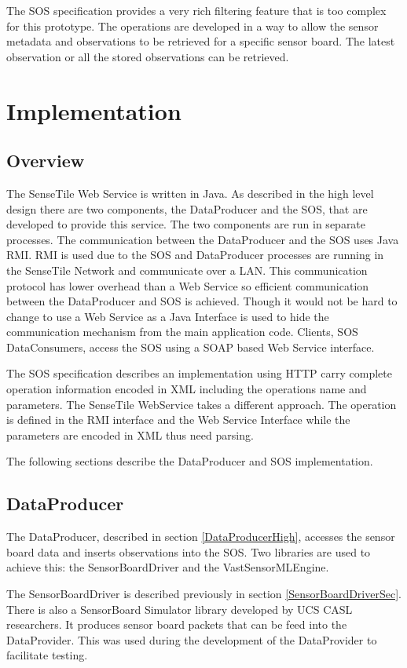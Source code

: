 \documentclass[]{final_report}
\begin{document}
The SOS specification provides a very rich filtering feature that is too complex for this prototype. The operations are developed in a way to allow the sensor metadata and observations to be retrieved for a specific sensor board. The latest observation or all the stored observations can be retrieved.

\chapter{Implementation}
\section{Overview}
The SenseTile Web Service is written in Java. As described in the high level design there are two components, the DataProducer and the SOS, that are developed to provide this service. The two components are run in separate processes. The communication between the DataProducer and the SOS uses Java RMI. RMI is used due to the SOS and DataProducer
processes are running in the SenseTile Network and communicate over a LAN. This communication protocol has lower overhead than a Web Service so efficient communication between the DataProducer and SOS is achieved. Though it would not be hard to change to use a Web Service as a Java Interface is used to hide the communication mechanism from the main application code. Clients, SOS DataConsumers, access the SOS using a SOAP based Web Service interface. 

The SOS specification describes an implementation using HTTP carry complete operation information encoded in XML including the operations name and parameters. The SenseTile WebService takes a different approach. The operation is defined in the RMI interface and the Web Service Interface while the parameters are encoded in XML thus need parsing.

The following sections describe the DataProducer and SOS implementation.
\section{DataProducer}
The DataProducer, described in section \ref{DataProducerHigh}, accesses the sensor board data and inserts observations into the SOS. Two libraries are used to achieve this: the SensorBoardDriver and the VastSensorMLEngine.

The SensorBoardDriver is described previously in section \ref{SensorBoardDriverSec}. There is also a SensorBoard Simulator library developed by UCS CASL researchers. It produces sensor board packets that can be feed into the DataProvider. This was used during the development of the DataProvider to facilitate testing. 
\end{document}
